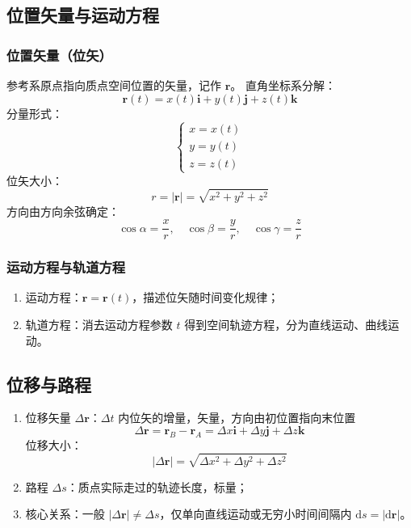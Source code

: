     \subsection{位置矢量与运动方程}
    \subsubsection{位置矢量（位矢）}
    参考系原点指向质点空间位置的矢量，记作 $\boldsymbol{r}$。
    直角坐标系分解：
    \[
    \boldsymbol{r}(t) = x(t)\boldsymbol{i} + y(t)\boldsymbol{j} + z(t)\boldsymbol{k}
    \]
    分量形式：
    \[
    \begin{cases}
    x = x(t)\\
    y = y(t)\\
    z = z(t)
    \end{cases}
    \]
    位矢大小：
    \[
    r = |\boldsymbol{r}| = \sqrt{x^2+y^2+z^2}
    \]
    方向由方向余弦确定：
    \[
    \cos\alpha = \frac{x}{r},\quad \cos\beta = \frac{y}{r},\quad \cos\gamma = \frac{z}{r}
    \]

    \subsubsection{运动方程与轨道方程}
    \begin{enumerate}
        \item 运动方程：$\boldsymbol{r}=\boldsymbol{r}(t)$，描述位矢随时间变化规律；
        \item 轨道方程：消去运动方程参数 $t$ 得到空间轨迹方程，分为直线运动、曲线运动。
    \end{enumerate}

    \subsection{位移与路程}
    \begin{enumerate}
        \item 位移矢量 $\Delta\boldsymbol{r}$：$\Delta t$ 内位矢的增量，矢量，方向由初位置指向末位置
        \[
        \Delta\boldsymbol{r} = \boldsymbol{r}_B - \boldsymbol{r}_A = \Delta x \boldsymbol{i} + \Delta y \boldsymbol{j} + \Delta z \boldsymbol{k}
        \]
        位移大小：
        \[
        |\Delta\boldsymbol{r}| = \sqrt{\Delta x^2+\Delta y^2+\Delta z^2}
        \]
        \item 路程 $\Delta s$：质点实际走过的轨迹长度，标量；
        \item 核心关系：一般 $|\Delta\boldsymbol{r}| \neq \Delta s$，仅单向直线运动或无穷小时间间隔内 $\mathrm{d}s = |\mathrm{d}\boldsymbol{r}|$。
    \end{enumerate}

